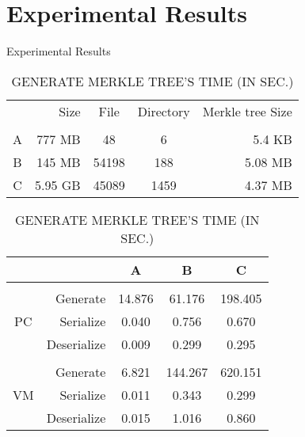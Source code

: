 \section{Experimental Results}

\begin{frame}{Experimental Results}
	\begin{table}[]
		\scriptsize
		\centering
		\begin{tabular}{crccr}
			  & Size    & File  & Directory & Merkle tree Size \\
			  &			&		&		    &                  \\
			A & 777 MB  & 48    & 6         & 5.4 KB           \\
			B & 145 MB  & 54198 & 188       & 5.08 MB          \\
			C & 5.95 GB & 45089 & 1459      & 4.37 MB          \\
		\end{tabular}
        
		\caption{GENERATE MERKLE TREE'S TIME (IN SEC.)}
		\begin{tabular}{|c|r|c|c|c|}
			\hline
			   &             & A      & B       & C       \\ \hline
               &             &        &		    &		  \\ \hline
			   & Generate    & 14.876 & 61.176  & 198.405 \\ \cline{2-5} 
			PC & Serialize   & 0.040  & 0.756   & 0.670   \\ \cline{2-5} 
			   & Deserialize & 0.009  & 0.299   & 0.295   \\ \hline
		   	   &             &        &         &         \\ \hline
			   & Generate    & 6.821  & 144.267 & 620.151 \\ \cline{2-5} 
			VM & Serialize   & 0.011  & 0.343   & 0.299   \\ \cline{2-5} 
			   & Deserialize & 0.015  & 1.016   & 0.860   \\
			\hline
		\end{tabular}
	\end{table}
\end{frame}

